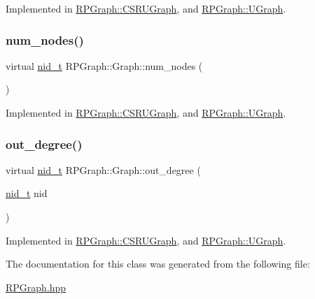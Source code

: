 Implemented in \mbox{\hyperlink{classRPGraph_1_1CSRUGraph_a90ef3e196b0e234c8806bc455031018d}{R\+P\+Graph\+::\+C\+S\+R\+U\+Graph}}, and \mbox{\hyperlink{classRPGraph_1_1UGraph_a55a5deea9a4d456e78e24a2002f31ef2}{R\+P\+Graph\+::\+U\+Graph}}.

\mbox{\label{classRPGraph_1_1Graph_ab5602e6b776a0ea3b944775331fcb2aa}} 
\subsubsection{\texorpdfstring{num\+\_\+nodes()}{num\_nodes()}}
{\footnotesize\ttfamily virtual \mbox{\hyperlink{namespaceRPGraph_ab3ae34f1ab88e48f43794c30c8697b74}{nid\+\_\+t}} R\+P\+Graph\+::\+Graph\+::num\+\_\+nodes (\begin{DoxyParamCaption}{ }\end{DoxyParamCaption})\hspace{0.3cm}{\ttfamily [pure virtual]}}



Implemented in \mbox{\hyperlink{classRPGraph_1_1CSRUGraph_a715af46d35bbe09b6b7d724461a1c2a5}{R\+P\+Graph\+::\+C\+S\+R\+U\+Graph}}, and \mbox{\hyperlink{classRPGraph_1_1UGraph_ad5eb18fffb7b9a64819b3f1f38305a0c}{R\+P\+Graph\+::\+U\+Graph}}.

\mbox{\label{classRPGraph_1_1Graph_a660ad58e03df7e3cc00d0eb4e5c16819}} 
\subsubsection{\texorpdfstring{out\+\_\+degree()}{out\_degree()}}
{\footnotesize\ttfamily virtual \mbox{\hyperlink{namespaceRPGraph_ab3ae34f1ab88e48f43794c30c8697b74}{nid\+\_\+t}} R\+P\+Graph\+::\+Graph\+::out\+\_\+degree (\begin{DoxyParamCaption}\item[{\mbox{\hyperlink{namespaceRPGraph_ab3ae34f1ab88e48f43794c30c8697b74}{nid\+\_\+t}}}]{nid }\end{DoxyParamCaption})\hspace{0.3cm}{\ttfamily [pure virtual]}}



Implemented in \mbox{\hyperlink{classRPGraph_1_1CSRUGraph_a952e2a8eea28c0d879a0b5688d0e1b06}{R\+P\+Graph\+::\+C\+S\+R\+U\+Graph}}, and \mbox{\hyperlink{classRPGraph_1_1UGraph_a8416a5fa8b87b8569d0fa563288ac162}{R\+P\+Graph\+::\+U\+Graph}}.



The documentation for this class was generated from the following file\+:\begin{DoxyCompactItemize}
\item 
\mbox{\hyperlink{RPGraph_8hpp}{R\+P\+Graph.\+hpp}}\end{DoxyCompactItemize}
